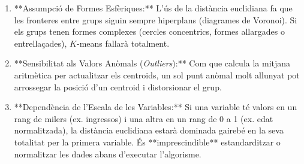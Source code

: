 \documentclass[11pt, a4paper]{article}
\begin{document}
\begin{enumerate}
    \item **Assumpció de Formes Esfèriques:** L'ús de la distància euclidiana fa que les fronteres entre grups siguin sempre hiperplans (diagrames de Voronoi). Si els grups tenen formes complexes (cercles concentrics, formes allargades o entrellaçades), $K$-means fallarà totalment.
    \item **Sensibilitat als Valors Anòmals (\textit{Outliers}):** Com que calcula la mitjana aritmètica per actualitzar els centroids, un sol punt anòmal molt allunyat pot arrossegar la posició d'un centroid i distorsionar el grup.
    \item **Dependència de l'Escala de les Variables:** Si una variable té valors en un rang de milers (ex. ingressos) i una altra en un rang de 0 a 1 (ex. edat normalitzada), la distància euclidiana estarà dominada gairebé en la seva totalitat per la primera variable. És **imprescindible** estandarditzar o normalitzar les dades abans d'executar l'algorisme.
\end{enumerate}
\end{document}
